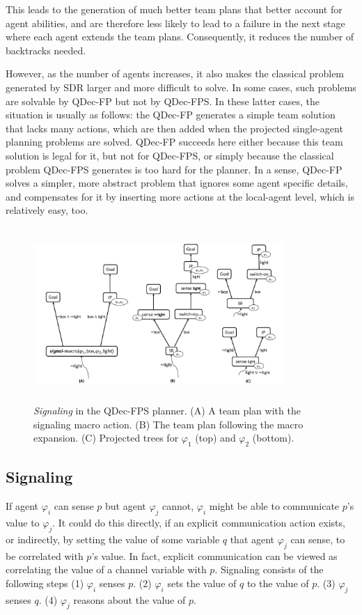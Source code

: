 \documentclass[letterpaper]{article} %
\theoremstyle{definition}
\begin{document}
{This leads to the generation of much better team plans that better account for agent abilities, and are therefore less likely to lead to a failure in the next stage where each agent extends the team plans. Consequently, it reduces the number of backtracks needed.

However, as the number of agents increases, it also makes the classical problem generated by SDR larger and more difficult to solve.
In some cases, such problems are solvable by QDec-FP
but not by QDec-FPS.
In these latter cases, the situation is usually as follows: the QDec-FP generates a simple team solution that lacks many actions, which are then added when the projected single-agent planning problems are solved.
QDec-FP succeeds here either because this team solution is legal for it, but not for QDec-FPS, or
simply because the classical problem QDec-FPS generates is too hard for the planner.
In a sense, QDec-FP solves a simpler, more abstract problem that ignores some agent specific details, and compensates for it by inserting more actions at the local-agent level, which is relatively easy, too.
}



\begin{figure}[h!]
\centering
\includegraphics[height=2.6in, width=0.85\textwidth]{signaling-r.pdf}
\caption{
\emph{Signaling} in the QDec-FPS planner.
(A) A team plan with the signaling macro action.
(B) The team plan following the macro expansion.
(C) Projected trees for $\varphi_1$ (top) and $\varphi_2$ (bottom).
}
\label{fig:signaling}
\end{figure}

\subsection{Signaling}
\label{subsec:signal}
If agent $\varphi_i$ can sense $p$ but agent $\varphi_j$ cannot, $\varphi_i$ might be able to communicate $p$'s value to $\varphi_j$.
It could do this directly, if an explicit communication action exists, or indirectly, by setting the value of some variable $q$ that agent $\varphi_j$ can sense, to be correlated with $p$'s value.
In fact, explicit communication can be viewed as correlating the value of a channel variable with $p$.
Signaling consists of the following steps (1) $\varphi_i$ senses $p$. (2) $\varphi_i$ sets the value of $q$ to the value of $p$. (3)  $\varphi_j$ senses $q$. (4) $\varphi_j$ reasons about the value of $p$.
\end{document}
